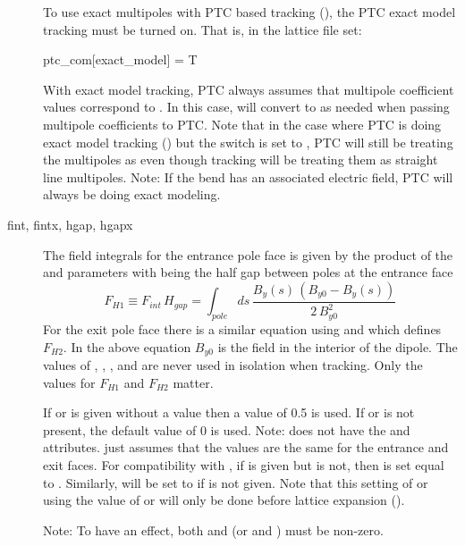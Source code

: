 \begin{description}
To use exact multipoles with PTC based tracking (), the PTC exact model
tracking must be turned on. That is, in the lattice file set:
\begin{example2}
  ptc_com[exact_model] = T
\end{example2}
With exact model tracking, PTC always assumes that multipole coefficient values correspond to
. In this case, \bmad will convert  to
 as needed when passing multipole coefficients to PTC. Note that in
the case where PTC is doing exact model tracking () but the
 switch is set to , PTC will still be treating the multipoles
as  even though \bmad tracking will be treating them as straight
line multipoles. Note: If the bend has an associated electric field, PTC will always be
doing exact modeling.
  \item[fint, fintx, \Newline hgap, hgapx] \Newline
The field integrals for the entrance pole face is given by the product of the  and
 parameters with  being the half gap between poles at the entrance face
\begin{equation}
  F_{H1} \equiv F_{int} \, H_{gap} = \int_{pole} \! \! ds \, \frac{B_y(s) \, (B_{y0} - B_y(s))}
  {2 \, B_{y0}^2}
  \label{fsbbb}
\end{equation}
For the exit pole face there is a similar equation using  and  which defines
$F_{H2}$. In the above equation $B_{y0}$ is the field in the interior of the dipole. The values of
, , , and  are never used in isolation when tracking. Only
the values for $F_{H1}$ and $F_{H2}$ matter.

If  or  is given without a value then a value of 0.5 is used. If  or
 is not present, the default value of 0 is used. Note: \mad does not have the 
and  attributes. \mad just assumes that the values are the same for the entrance and exit
faces. For compatibility with \mad, if  is given but  is not, then  is
set equal to . Similarly,  will be set to  if  is not
given. Note that this setting of  or  using the value of  or 
will only be done before lattice expansion ().

Note: To have an effect, both  and  (or  and ) must be non-zero.


\end{description}
